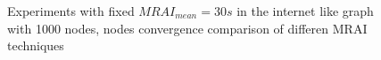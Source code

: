 \documentclass[10pt,conference,letterpaper]{IEEEtran}
\newcommand{\figvspace}{-1.5em}
\begin{document}
\begin{figure}[tb]
	\caption{Experiments with fixed $MRAI_{mean} = 30s$ in the internet like graph with \ac{1000}
			nodes, nodes convergence comparison of differen \ac{MRAI} techniques
			}
	\label{fig:s_aw_converged_nodes_1000}
	\vspace{\figvspace}
\end{figure}



\end{document}
